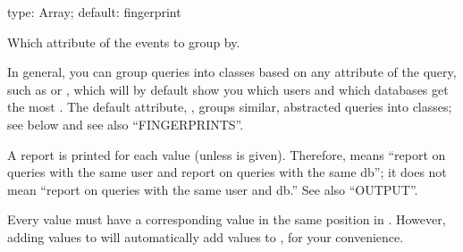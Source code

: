 \documentclass[letterpaper,10pt,english]{sphinxmanual}
\begin{document}

\begin{fulllineitems}
\label{\detokenize{mariadb-query-digest:cmdoption-mariadb-query-digest-group-by}}
type: Array; default: fingerprint

Which attribute of the events to group by.

In general, you can group queries into classes based on any attribute of the
query, such as  or , which will by default show you which users
and which databases get the most .  The default attribute,
, groups similar, abstracted queries into classes; see below
and see also “FINGERPRINTS”.

A report is printed for each {\hyperref[\detokenize{mariadb-query-digest:cmdoption-mariadb-query-digest-group-by}]{}} value (unless  is
given).  Therefore,  means “report on queries with the
same user and report on queries with the same db”; it does not mean “report
on queries with the same user and db.”  See also “OUTPUT”.

Every value must have a corresponding value in the same position in
{\hyperref[\detokenize{mariadb-query-digest:cmdoption-mariadb-query-digest-order-by}]{}}.  However, adding values to {\hyperref[\detokenize{mariadb-query-digest:cmdoption-mariadb-query-digest-group-by}]{}} will automatically
add values to {\hyperref[\detokenize{mariadb-query-digest:cmdoption-mariadb-query-digest-order-by}]{}}, for your convenience.


\end{fulllineitems}
\end{document}
